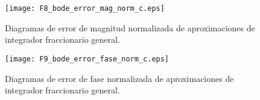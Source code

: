 \begin{figure}[hbtp]
	\caption{Diagramas de error de magnitud normalizada de aproximaciones de integrador fraccionario general.}
	\centering
	\texttt{[image: F8\_bode\_error\_mag\_norm\_c.eps]}
\end{figure}

\begin{figure}[hbtp]
	\caption{Diagramas de error de fase normalizada de aproximaciones de integrador fraccionario general.}
	\centering
	\texttt{[image: F9\_bode\_error\_fase\_norm\_c.eps]}
\end{figure}